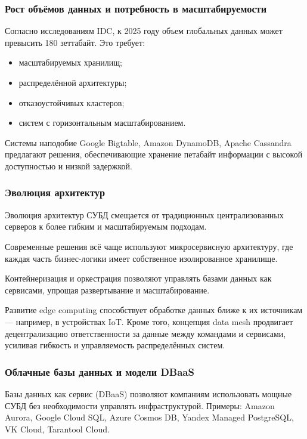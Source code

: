 \subsubsection{Рост объёмов данных и потребность в масштабируемости}

Согласно исследованиям IDC, к 2025 году объем глобальных данных может превысить 180 зеттабайт. Это требует:
\begin{itemize}
	\item масштабируемых хранилищ;
	\item распределённой архитектуры;
	\item отказоустойчивых кластеров;
	\item систем с горизонтальным масштабированием.
\end{itemize}

Системы наподобие Google Bigtable, Amazon DynamoDB, Apache Cassandra предлагают решения, обеспечивающие хранение петабайт информации с высокой доступностью и низкой задержкой.

\subsubsection{Эволюция архитектур}

Эволюция архитектур СУБД смещается от традиционных централизованных серверов к более гибким и масштабируемым подходам. 

Современные решения всё чаще используют микросервисную архитектуру, где каждая часть бизнес-логики имеет собственное изолированное хранилище.

Контейнеризация и оркестрация позволяют управлять базами данных как сервисами, упрощая развертывание и масштабирование. 

Развитие edge computing способствует обработке данных ближе к их источникам — например, в устройствах IoT. Кроме того, концепция data mesh продвигает децентрализацию ответственности за данные между командами и сервисами, усиливая гибкость и управляемость распределённых систем.

\subsubsection{Облачные базы данных и модели DBaaS}

Базы данных как сервис (DBaaS) позволяют компаниям использовать мощные СУБД без необходимости управлять инфраструктурой. Примеры: Amazon Aurora, Google Cloud SQL, Azure Cosmos DB, Yandex Managed PostgreSQL, VK Cloud, Tarantool Cloud.

